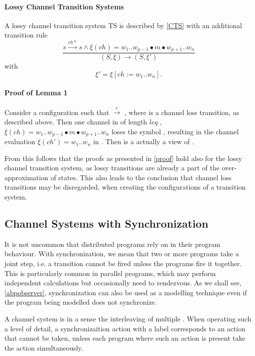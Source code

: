 \paragraph{Lossy Channel Transition Systems}
A lossy channel transition system TS is described by \ref{CTS} with an additional transition rule
      \[
      \dfrac{s \xrightarrow{ch*} s \wedge \xi(ch) = w_1..w_{p-1}\bullet m \bullet w_{p+1}..w_n}{(S, \xi) \rightarrow (S, \xi')} \] with \[ \xi' = \xi[ch:= w_1..w_n].
      \]

\paragraph{Proof of Lemma 1}
Consider a configuration  such that  $\xrightarrow{r}$ , where  is a channel loss transition, as described above. Then one channel  in  of length  $leq$ , $\xi(ch) = w_1..w_{p-1}\bullet m \bullet w_{p+1}..w_n$ loses the symbol , resulting in the channel evaluation $\xi(ch') = w_1..w_n$ in . Then  is a actually a view of .

From this follows that the proofs as presented in \ref{proof} hold also for the lossy channel transition system, as lossy transitions are already a part of the over-approximation of states. This also leads to the conclusion that channel loss transitions may be disregarded, when creating the configurations of a transition system.

\subsection{Channel Systems with Synchronization}
It is not uncommon that distributed programs rely on  in their program behaviour. With synchronization, we mean that two or more programs take a joint step, i.e. a transition cannot be fired unless the programs fire it together. This is particularly common in parallel programs, which may perform independent calculations but occasionally need to rendezvous. As we shall see, \ref{abpobserver}, synchronization can also be used as a modelling technique even if the program being modelled does not synchronize.

A channel system is in a sense the interleaving of multiple . When operating such a level of detail, a synchronizaition action with a label  corresponds to an action that cannot be taken, unless each program where such an action is present take the action simultaneously.

